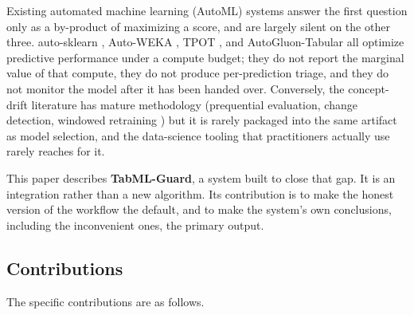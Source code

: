 \documentclass{ieeeaccess}
\begin{document}
Existing automated machine learning (AutoML) systems answer the first question only as a by-product of maximizing a score, and are largely silent on the other three. auto-sklearn \cite{feurer2015auto}, Auto-WEKA \cite{kotthoff2013auto}, TPOT \cite{olson2016tpot}, and AutoGluon-Tabular \cite{erickson2020autogluon} all optimize predictive performance under a compute budget; they do not report the marginal value of that compute, they do not produce per-prediction triage, and they do not monitor the model after it has been handed over. Conversely, the concept-drift literature has mature methodology (prequential evaluation, change detection, windowed retraining \cite{gama2014survey,zliobaite2010learning}) but it is rarely packaged into the same artifact as model selection, and the data-science tooling that practitioners actually use rarely reaches for it.

This paper describes \textbf{TabML-Guard}, a system built to close that gap. It is an integration rather than a new algorithm. Its contribution is to make the honest version of the workflow the default, and to make the system's own conclusions, including the inconvenient ones, the primary output.

\subsection{Contributions}
The specific contributions are as follows.
\end{document}
